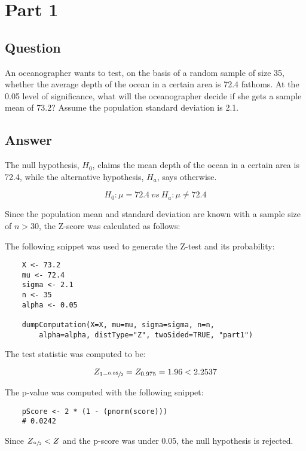 \section{Part 1}
    \subsection{Question}
    An oceanographer wants to test, on the basis of a random sample of size 35, whether the average depth of the ocean in a certain area is 72.4 fathoms. At the 0.05 level of significance, what will the oceanographer decide if she gets a sample mean of 73.2? Assume the population standard deviation is 2.1.

    \subsection{Answer}
    The null hypothesis, $H_{0}$, claims the mean depth of the ocean in a certain area is 72.4, while the alternative hypothesis, $H_{a}$, says otherwise.

        \[ H_{0}: \mu = 72.4 \ vs \ H_{a}: \mu \neq 72.4 \]

    Since the population mean and standard deviation are known with a sample size of $n > 30$, the Z-score was calculated as follows:

        \newline

    The following snippet was used to generate the Z-test and its probability:
\begin{lstlisting}
    X <- 73.2
    mu <- 72.4
    sigma <- 2.1
    n <- 35
    alpha <- 0.05

    dumpComputation(X=X, mu=mu, sigma=sigma, n=n, 
        alpha=alpha, distType="Z", twoSided=TRUE, "part1")
\end{lstlisting}

    The test statistic was computed to be:

    \begin{equation*}
        Z_{1-\sfrac{0.05}{2}}=Z_{0.975}= 1.96 < 2.2537
    \end{equation*}

    The p-value was computed with the following snippet:
\begin{lstlisting}
    pScore <- 2 * (1 - (pnorm(score)))
    # 0.0242
\end{lstlisting}

    Since $Z_{\sfrac{\alpha}{2}} < Z$ and the p-score was under 0.05, the null hypothesis is rejected.
